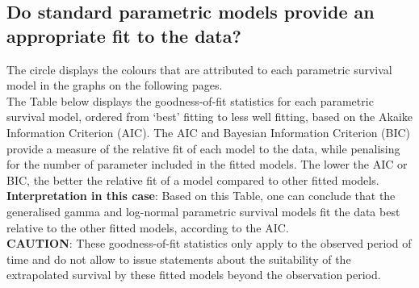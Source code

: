 \documentclass[
]{article}
\begin{document}
\hypertarget{do-standard-parametric-models-provide-an-appropriate-fit-to-the-data}{%
\subsection{Do standard parametric models provide an appropriate fit to
the
data?}\label{do-standard-parametric-models-provide-an-appropriate-fit-to-the-data}}

The circle displays the colours that are attributed to each parametric
survival model in the graphs on the following pages.\\
The Table below displays the goodness-of-fit statistics for each
parametric survival model, ordered from `best' fitting to less well
fitting, based on the Akaike Information Criterion (AIC). The AIC and
Bayesian Information Criterion (BIC) provide a measure of the relative
fit of each model to the data, while penalising for the number of
parameter included in the fitted models. The lower the AIC or BIC, the
better the relative fit of a model compared to other fitted models.\\
\textbf{Interpretation in this case}: Based on this Table, one can
conclude that the generalised gamma and log-normal parametric survival
models fit the data best relative to the other fitted models, according
to the AIC.\\
\textbf{CAUTION}: These goodness-of-fit statistics only apply to the
observed period of time and do not allow to issue statements about the
suitability of the extrapolated survival by these fitted models beyond
the observation period.
\end{document}
